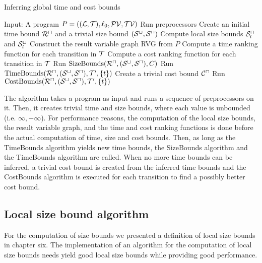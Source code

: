 \begin{algorithm}
\caption{Inferring global time and cost bounds}\label{complete_algorithm}
\begin{algorithmic}[1]
  \State Input: A program $P = ((\mathcal{L}, \mathcal{T}),\ell_0,\mathcal{PV},\mathcal{TV})$
  \State Run preprocessors
  \State Create an initial time bound ${\mathcal{R}^\sqcap}$ and a trivial size bound ${({\mathcal{S}^\sqcup}, {\mathcal{S}^\sqcap})}$
  \State Compute local size bounds ${\mathcal{S}^\sqcap_l}$ and ${\mathcal{S}^\sqcup_l}$
  \State Construct the result variable graph RVG from $P$
  \State Compute a time ranking function for each transition in $\mathcal{T}$
  \State Compute a cost ranking function for each transition in $\mathcal{T}$
  \Repeat
      \State Run $\text{SizeBounds}({\mathcal{R}^\sqcap}, {({\mathcal{S}^\sqcup}, {\mathcal{S}^\sqcap})}, C)$
    \EndFor
        \State Run $\text{TimeBounds}({\mathcal{R}^\sqcap}, {({\mathcal{S}^\sqcup}, {\mathcal{S}^\sqcap})}, \mathcal{T}', \lbrace t \rbrace)$
      \EndFor
    \EndFor
  \State Create a trivial cost bound ${\mathcal{C}^\sqcap}$
    \State Run $\text{CostBounds}({\mathcal{R}^\sqcap}, {({\mathcal{S}^\sqcup}, {\mathcal{S}^\sqcap})}, \mathcal{T}', \lbrace t \rbrace)$
  \EndFor
\end{algorithmic}
\end{algorithm}

The algorithm takes a program as input and runs a sequence of preprocessors on it.
Then, it creates trivial time and size bounds, where each value is unbounded (i.e. $\infty, -\infty$).
For performance reasons, the computation of the local size bounds, the result variable graph, and the time and cost ranking functions is done before the actual computation of time, size and cost bounds.
Then, as long as the TimeBounds algorithm yields new time bounds, the SizeBounds algorithm and the TimeBounds algorithm are called.
When no more time bounds can be inferred, a trivial cost bound is created from the inferred time bounds and the CostBounds algorithm is executed for each transition to find a possibly better cost bound.

\subsection{Local size bound algorithm}

For the computation of size bounds we presented a definition of local size bounds in chapter six.
The implementation of an algorithm for the computation of local size bounds needs yield good local size bounds while providing good performance.

